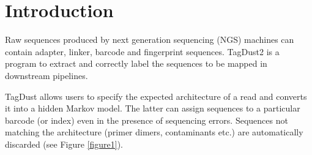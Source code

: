 \documentclass[11pt,a4paper,oneside]{book}
\begin{document}
\tableofcontents
\mainmatter

\chapter{Introduction}


Raw sequences produced by next generation sequencing (NGS) machines can contain adapter, linker, barcode and fingerprint sequences. TagDust2 is a program to extract and correctly label the sequences to be mapped in downstream pipelines.

TagDust allows users to specify the expected architecture of a read and converts it into a hidden Markov model. The latter can assign sequences to a particular barcode (or index) even in the presence of sequencing errors. Sequences not matching the architecture (primer dimers, contaminants etc.) are automatically discarded (see Figure \ref{figure1}).


\end{document}
